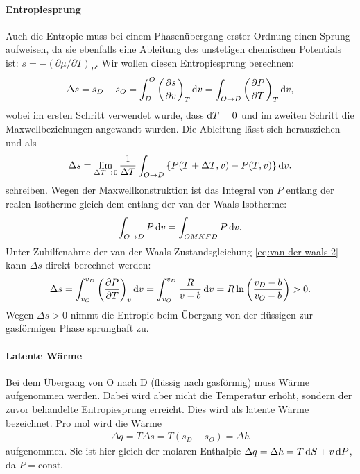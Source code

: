 \paragraph*{Entropiesprung}

Auch die Entropie muss bei einem Phasenübergang erster Ordnung einen Sprung aufweisen, da sie ebenfalls eine Ableitung des unstetigen chemischen Potentials ist: $s=-(\partial\mu/\partial T)_P$. Wir wollen diesen Entropiesprung berechnen:
\begin{align*}
    \Delta s = s_D-s_O = \int_D^O \left( \frac{\partial s}{\partial v} \right)_T\mathop{}\!\mathrm{d} v = \int_{O\rightarrow D} \left( \frac{\partial P}{\partial T} \right)_T\mathop{}\!\mathrm{d} v,
\end{align*}
wobei im ersten Schritt verwendet wurde, dass $\mathop{}\!\mathrm{d} T=0$ und im zweiten Schritt die Maxwellbeziehungen angewandt wurden. Die Ableitung lässt sich herausziehen und als 
\begin{align*}
    \Delta s = \lim_{\Delta T\rightarrow 0} \frac{1}{\Delta T} \int_{O\rightarrow D}\left\{ P(T+\Delta T,v) - P(T,v) \right\}\mathop{}\!\mathrm{d} v.
\end{align*}
schreiben. Wegen der Maxwellkonstruktion ist das Integral von $P$ entlang der realen Isotherme gleich dem entlang der van-der-Waals-Isotherme:
\begin{align*}
    \int_{O\rightarrow D} P\mathop{}\!\mathrm{d} v = \int_{OMKFD} P\mathop{}\!\mathrm{d} v.
\end{align*}
Unter Zuhilfenahme der van-der-Waals-Zustandsgleichung \eqref{eq:van der waals 2} kann $\Delta s$ direkt berechnet werden:
\begin{align}
    \Delta s = \int_{v_O}^{v_D} \left(\frac{\partial P }{\partial T}\right)_v\mathop{}\!\mathrm{d} v = \int_{v_O}^{v_D} \frac{R}{v-b}\mathop{}\!\mathrm{d} v = R \ln\left( \frac{v_D-b}{v_O-b} \right) > 0. 
\end{align}
Wegen $\Delta s>0$ nimmt die Entropie beim Übergang von der flüssigen zur gasförmigen Phase sprunghaft zu. 


\paragraph*{Latente Wärme}

Bei dem Übergang von O nach D (flüssig nach gasförmig) muss Wärme aufgenommen werden. Dabei wird aber nicht die Temperatur erhöht, sondern der zuvor behandelte Entropiesprung erreicht. Dies wird als latente Wärme bezeichnet. Pro \unit{\mole} wird die Wärme
\begin{align}
    \Delta q = T\Delta s = T(s_D-s_O) = \Delta h
\end{align}
aufgenommen. Sie ist hier gleich der molaren Enthalpie $\Delta q = \Delta h = T\mathop{}\!\mathrm{d} S+v\mathop{}\!\mathrm{d} P$, da $P=\mathrm{const}$. 

